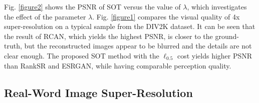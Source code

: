 \documentclass[10pt,journal,compsoc]{IEEEtran}
\begin{document}
Fig. \ref{figure2} shows the PSNR of SOT versus the value of $\lambda$,
which investigates the effect of the parameter $\lambda$. 
Fig. \ref{figure1} compares the visual quality of 4x 
super-resolution on a typical sample from the DIV2K dataset. 
It can be seen that the result of RCAN, which yields the
highest PSNR, is closer to the ground-truth, but the 
reconstructed images appear to be blurred and the 
details are not clear enough. 
The proposed SOT method with the $\ell_{0.5}$ cost yields higher PSNR
than RankSR and ESRGAN, while having comparable perception quality.


\subsection{Real-Word Image Super-Resolution}
\end{document}
